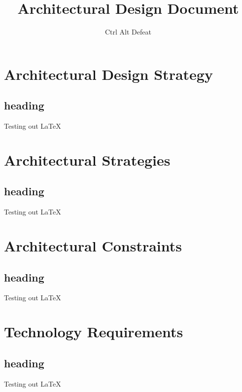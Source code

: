 \documentclass[12pt]{article}
\title{Architectural Design Document}
\author{Ctrl Alt Defeat}
\begin{document}
\maketitle

\section{Architectural Design Strategy}
\subsection{heading}
Testing out LaTeX

\section{Architectural Strategies}
\subsection{heading}
Testing out LaTeX

\section{Architectural Constraints}
\subsection{heading}
Testing out LaTeX

\section{Technology Requirements}
\subsection{heading}
Testing out LaTeX
\end{document}
